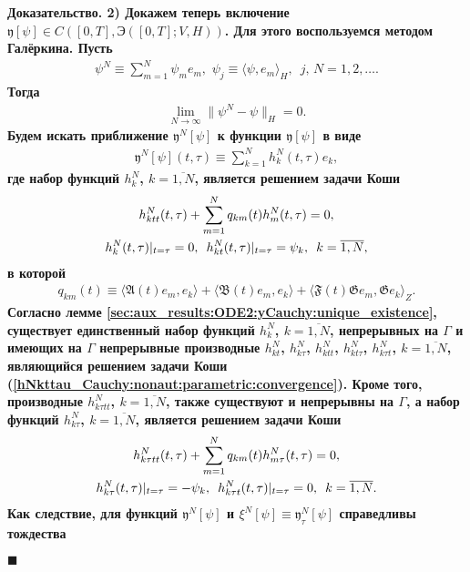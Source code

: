 \documentclass{report}
\newenvironment{Proof}{\par\noindent\bf Доказательство.\rm}{ $\blacksquare$\par}
\begin{document}
\begin{Proof}
2) Докажем теперь включение $\mathfrak{y}[\psi]\in C([0,T],\textrm{Э}([0,T];V,H))$. Для этого воспользуемся методом Галёркина. Пусть
\begin{gather*}
\psi^N\equiv\sum\limits_{m=1}^N\psi_me_m,\,\,\psi_j\equiv\langle\psi,e_m\rangle_H,\,\,\,j,\,N=1,2,\dots.
\end{gather*}
Тогда
\begin{gather}\label{psiN:nonaut:parametric:convergence}
\lim\limits_{N\to\infty}\|\psi^N-\psi\|_H=0.
\end{gather}
Будем искать приближение $\mathfrak{y}^N[\psi]$ к функции $\mathfrak{y}[\psi]$ в виде
\begin{gather*}
\mathfrak{y}^N[\psi](t,\tau)\equiv\sum\limits_{k=1}^Nh^N_k(t,\tau)e_k,
\end{gather*}
где набор функций $h^N_k$, $k=\overline{1,N}$, является решением задачи Коши
\begin{gather}\label{hNkttau_Cauchy:nonaut:parametric:convergence}
h^N_{ktt}(t,\tau)+\sum\limits_{m=1}^Nq_{km}(t)h^N_{m}(t,\tau)=0,\\
\notag h^N_k(t,\tau)|_{t=\tau}=0,\,\,\,h^N_{kt}(t,\tau)|_{t=\tau}=\psi_k,\,\,\,k=\overline{1,N},
\end{gather}
в которой
\begin{gather*}
q_{km}(t)\equiv\langle\mathfrak{A}(t)e_m,e_k\rangle+\langle\mathfrak{B}(t)e_m,e_k\rangle + \langle\mathfrak{F}(t)\mathfrak{G}e_m, \mathfrak{G}e_k\rangle_Z.
\end{gather*}
Согласно лемме \ref{sec:aux_results:ODE2:yCauchy:unique_existence}, существует единственный набор функций $h_k^N$, $k=\overline{1,N}$, непрерывных на $\Gamma$ и имеющих на $\Gamma$
непрерывные производные $h^N_{kt}$, $h^N_{k\tau}$, $h^N_{ktt}$, $h^N_{kt\tau}$, $h^N_{k\tau t}$, $k=\overline{1,N}$, являющийся решением задачи Коши (\ref{hNkttau_Cauchy:nonaut:parametric:convergence}).
Кроме того, производные $h^N_{k\tau tt}$, $k=\overline{1,N}$, также существуют и непрерывны на $\Gamma$, а набор функций $h_{k\tau}^N$, $k=\overline{1,N}$, является решением задачи Коши
\begin{gather}\label{hN_tau_kttau_Cauchy:nonaut:parametric:convergence}
h^N_{k\tau tt}(t,\tau)+\sum\limits_{m=1}^Nq_{km}(t)h^N_{m\tau}(t,\tau)=0,\\
\notag h^N_{k\tau}(t,\tau)|_{t=\tau}=-\psi_k,\,\,\,h^N_{k\tau t}(t,\tau)|_{t=\tau}=0,\,\,\,k=\overline{1,N}.
\end{gather}
Как следствие, для функций $\mathfrak{y}^N[\psi]$ и $\xi^N[\psi]\equiv\mathfrak{y}^N_\tau[\psi]$ справедливы тождества

\end{Proof}
\end{document}
